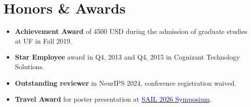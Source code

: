 \section{ Honors \& Awards }
\begin{itemize}[itemsep=0pt, parsep=0pt]
    \item{\textbf{Achievement Award} of 4500 USD during the admission of graduate studies at UF in Fall 2019.}
    \item {\textbf{Star Employee} award in Q4, 2013 and Q4, 2015 in Cognizant Technology Solutions.}
    \item {\textbf{Outstanding reviewer} in NeurIPS 2024, conference registration waived.}
    \item {\textbf{Travel Award} for poster presentation at \href{https://sail.health/event/sail-2026/program//} {\textcolor{blue}{SAIL 2026 Symposium}}.}
\end{itemize}
